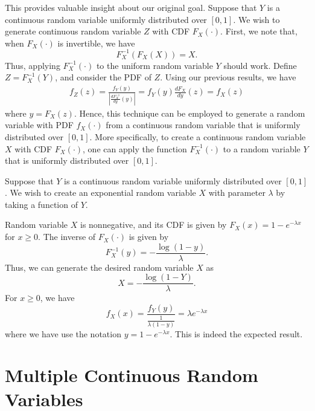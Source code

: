 This provides valuable insight about our original goal.
Suppose that $Y$ is a continuous random variable uniformly distributed over $[0,1]$.
We wish to generate continuous random variable $Z$ with CDF $F_X(\cdot)$.
First, we note that, when $F_X (\cdot)$ is invertible, we have
\begin{equation*}
F_X^{-1} \left( F_X (X) \right) = X .
\end{equation*}
Thus, applying $F_X^{-1} (\cdot)$ to the uniform random variable $Y$ should work.
Define $Z = F_X^{-1} (Y)$, and consider the PDF of $Z$.
Using our previous results, we have
\begin{equation*}
\begin{split}
f_Z (z) = \frac{ f_Y (y) }{ \left| \frac{d F_X^{-1}}{dy} (y) \right| }
= f_Y (y) \frac{d F_X}{dy} (z) = f_X (z)
\end{split}
\end{equation*}
where $y = F_X (z)$.
Hence, this technique can be employed to generate a random variable with PDF $f_X (\cdot)$ from a continuous random variable that is uniformly distributed over $[0,1]$.
More specifically, to create a continuous random variable $X$ with CDF $F_X (\cdot)$, one can apply the function $F_X^{-1} (\cdot)$ to a random variable $Y$ that is uniformly distributed over $[0,1]$.

\begin{example}
Suppose that $Y$ is a continuous random variable uniformly distributed over $[0,1]$.
We wish to create an exponential random variable $X$ with parameter $\lambda$ by taking a function of $Y$.

Random variable $X$ is nonnegative, and its CDF is given by $F_X(x) = 1 - e^{- \lambda x}$ for $x \geq 0$.
The inverse of $F_X (\cdot)$ is given by
\begin{equation*}
F_X^{-1} (y) = - \frac{ \log (1 - y) }{\lambda} .
\end{equation*}
Thus, we can generate the desired random variable $X$ as
\begin{equation*}
X = - \frac{ \log (1 - Y) }{\lambda} .
\end{equation*}
For $x \geq 0$, we have
\begin{equation*}
f_X (x) = \frac{ f_Y (y) }{ \frac{1}{\lambda (1 - y)} }
= \lambda e^{- \lambda x}
\end{equation*}
where we have use the notation $y = 1 - e^{- \lambda x}$.
This is indeed the expected result.
\end{example}


\section{Multiple Continuous Random Variables}

